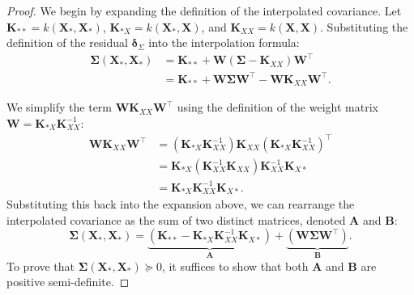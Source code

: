 \documentclass{article}
\begin{document}
\begin{proof}
We begin by expanding the definition of the interpolated covariance. Let $\mathbf{K}_{**} = k(\mathbf{X}_*, \mathbf{X}_*)$, $\mathbf{K}_{*X} = k(\mathbf{X}_*, \mathbf{X})$, and $\mathbf{K}_{XX} = k(\mathbf{X}, \mathbf{X})$. Substituting the definition of the residual $\boldsymbol{\delta}_{\Sigma}$ into the interpolation formula:
\begin{equation}
    \nonumber
\begin{aligned}
    \boldsymbol{\Sigma}(\mathbf{X}_*, \mathbf{X}_*) &= \mathbf{K}_{**} + \mathbf{W} (\boldsymbol{\Sigma} - \mathbf{K}_{XX}) \mathbf{W}^\top \\
    &= \mathbf{K}_{**} + \mathbf{W} \boldsymbol{\Sigma} \mathbf{W}^\top - \mathbf{W} \mathbf{K}_{XX} \mathbf{W}^\top.
\end{aligned}
\end{equation}

We simplify the term $\mathbf{W} \mathbf{K}_{XX} \mathbf{W}^\top$ using the definition of the weight matrix $\mathbf{W} = \mathbf{K}_{*X} \mathbf{K}_{XX}^{-1}$:
\begin{equation}
    \nonumber
    \begin{aligned}
        \mathbf{W} \mathbf{K}_{XX} \mathbf{W}^\top &= (\mathbf{K}_{*X} \mathbf{K}_{XX}^{-1}) \mathbf{K}_{XX} (\mathbf{K}_{*X} \mathbf{K}_{XX}^{-1})^\top \\
        &= \mathbf{K}_{*X} (\mathbf{K}_{XX}^{-1} \mathbf{K}_{XX}) \mathbf{K}_{XX}^{-1} \mathbf{K}_{X*} \\
        &= \mathbf{K}_{*X} \mathbf{K}_{XX}^{-1} \mathbf{K}_{X*}.
    \end{aligned}
\end{equation}
Substituting this back into the expansion above, we can rearrange the interpolated covariance as the sum of two distinct matrices, denoted $\mathbf{A}$ and $\mathbf{B}$:
\begin{equation}
    \nonumber
    \boldsymbol{\Sigma}(\mathbf{X}_*, \mathbf{X}_*) = \underbrace{\left( \mathbf{K}_{**} - \mathbf{K}_{*X} \mathbf{K}_{XX}^{-1} \mathbf{K}_{X*} \right)}_{\mathbf{A}} + \underbrace{\left( \mathbf{W} \boldsymbol{\Sigma} \mathbf{W}^\top \right)}_{\mathbf{B}}.
\end{equation}
To prove that $\boldsymbol{\Sigma}(\mathbf{X}_*, \mathbf{X}_*) \succeq 0$, it suffices to show that both $\mathbf{A}$ and $\mathbf{B}$ are positive semi-definite.


\end{proof}
\end{document}
